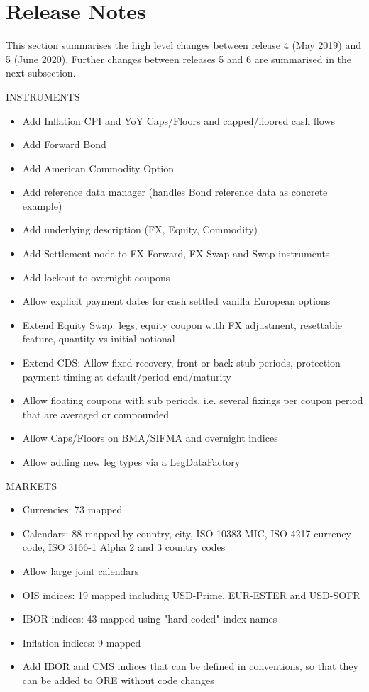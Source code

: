 \documentclass[12pt, a4paper]{article}
\begin{document}
\section{Release Notes}\label{sec:releasenotes}

This section summarises the high level changes between release 4 (May 2019) and 5 (June 2020).
Further changes between releases 5 and 6 are summarised in the next subsection.

\bigskip
INSTRUMENTS
\begin{itemize}
\item Add Inflation CPI and YoY Caps/Floors and capped/floored cash flows
\item Add Forward Bond
\item Add American Commodity Option
\item Add reference data manager (handles Bond reference data as concrete example)
\item Add underlying description (FX, Equity, Commodity)
\item Add Settlement node to FX Forward, FX Swap and Swap instruments 
\item Add lockout to overnight coupons
\item Allow explicit payment dates for cash settled vanilla European options
\item Extend Equity Swap: legs, equity coupon with FX adjustment, resettable feature,
  quantity vs initial notional
\item Extend CDS: Allow fixed recovery, front or back stub periods, protection payment
  timing at default/period end/maturity
\item Allow floating coupons with sub periods, i.e. several fixings per coupon period
  that are averaged or compounded
\item Allow Caps/Floors on BMA/SIFMA and overnight indices
\item Allow adding new leg types via a LegDataFactory
\end{itemize}

\bigskip
MARKETS

\begin{itemize}
\item Currencies: 73 mapped
\item Calendars: 88 mapped by country, city, ISO 10383 MIC, ISO 4217 currency code,
  ISO 3166-1 Alpha 2 and 3 country codes
\item Allow large joint calendars
\item OIS indices: 19 mapped including USD-Prime, EUR-ESTER and USD-SOFR
\item IBOR indices: 43 mapped using "hard coded" index names
\item Inflation indices: 9 mapped
\item Add IBOR and CMS indices that can be defined in conventions, so that they can be
  added to ORE without code changes
\end{itemize}
\end{document}
